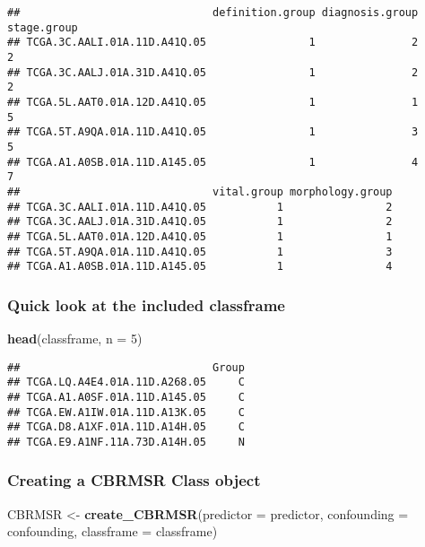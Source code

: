 \documentclass[
]{article}
\newenvironment{Shaded}{\begin{snugshade}}{\end{snugshade}}
\newcommand{\DataTypeTok}[1]{\textcolor[rgb]{0.13,0.29,0.53}{#1}}
\newcommand{\DecValTok}[1]{\textcolor[rgb]{0.00,0.00,0.81}{#1}}
\newcommand{\KeywordTok}[1]{\textcolor[rgb]{0.13,0.29,0.53}{\textbf{#1}}}
\newcommand{\NormalTok}[1]{#1}
\newcommand{\StringTok}[1]{\textcolor[rgb]{0.31,0.60,0.02}{#1}}
\begin{document}
\begin{verbatim}
##                              definition.group diagnosis.group stage.group
## TCGA.3C.AALI.01A.11D.A41Q.05                1               2           2
## TCGA.3C.AALJ.01A.31D.A41Q.05                1               2           2
## TCGA.5L.AAT0.01A.12D.A41Q.05                1               1           5
## TCGA.5T.A9QA.01A.11D.A41Q.05                1               3           5
## TCGA.A1.A0SB.01A.11D.A145.05                1               4           7
##                              vital.group morphology.group
## TCGA.3C.AALI.01A.11D.A41Q.05           1                2
## TCGA.3C.AALJ.01A.31D.A41Q.05           1                2
## TCGA.5L.AAT0.01A.12D.A41Q.05           1                1
## TCGA.5T.A9QA.01A.11D.A41Q.05           1                3
## TCGA.A1.A0SB.01A.11D.A145.05           1                4
\end{verbatim}

\hypertarget{quick-look-at-the-included-classframe}{%
\subsubsection{Quick look at the included
classframe}\label{quick-look-at-the-included-classframe}}

\begin{Shaded}
\begin{Highlighting}[]
\KeywordTok{head}\NormalTok{(classframe, }\DataTypeTok{n =} \DecValTok{5}\NormalTok{)}
\end{Highlighting}
\end{Shaded}

\begin{verbatim}
##                              Group
## TCGA.LQ.A4E4.01A.11D.A268.05     C
## TCGA.A1.A0SF.01A.11D.A145.05     C
## TCGA.EW.A1IW.01A.11D.A13K.05     C
## TCGA.D8.A1XF.01A.11D.A14H.05     C
## TCGA.E9.A1NF.11A.73D.A14H.05     N
\end{verbatim}

\hypertarget{creating-a-cbrmsr-class-object}{%
\subsubsection{Creating a CBRMSR Class
object}\label{creating-a-cbrmsr-class-object}}

\begin{Shaded}
\begin{Highlighting}[]
\NormalTok{CBRMSR <-}\StringTok{ }\KeywordTok{create_CBRMSR}\NormalTok{(}\DataTypeTok{predictor =}\NormalTok{ predictor, }\DataTypeTok{confounding =}\NormalTok{ confounding, }\DataTypeTok{classframe =}\NormalTok{ classframe)}
\end{Highlighting}
\end{Shaded}
\end{document}
